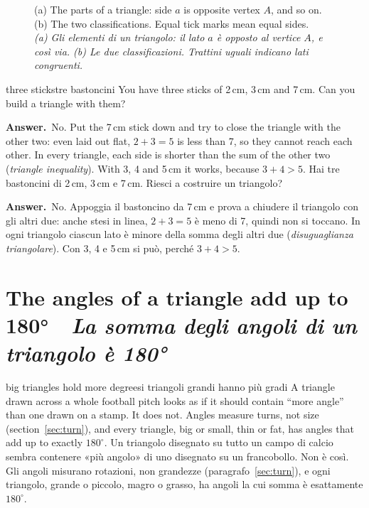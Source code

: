 \documentclass[10pt,a4paper,oneside]{book}
\newif\ifIT
\newcommand{\bisection}[2]{%
  \Needspace{7\baselineskip}%
  \section[#1 \textperiodcentered\ #2]{#1 {\color{itgreen}\itshape\,\textperiodcentered\ #2}}}
\newcommand{\bicap}[2]{\caption{#1\\{\color{itgreen}\itshape #2}}}
\newcommand{\answer}{\par\vspace{2pt}{\color{deeporange}\rule[0.5ex]{\linewidth}{0.4pt}}\par
  {\sffamily\bfseries\small\color{deeporange}\ifIT Risposta\else Answer\fi.}\ }
\begin{document}
\begin{figure}[htbp]
\bicap{(a) The parts of a triangle: side $a$ is opposite vertex $A$, and so on. (b) The two classifications. Equal tick marks mean equal sides.}%
      {(a) Gli elementi di un triangolo: il lato $a$ è opposto al vertice $A$, e così via. (b) Le due classificazioni. Trattini uguali indicano lati congruenti.}
\label{fig:anatomy}
\end{figure}

\begin{think}{three sticks}{tre bastoncini}
You have three sticks of 2\,cm, 3\,cm and 7\,cm. Can you build a triangle with them?
\answer No. Put the 7\,cm stick down and try to close the triangle with the other two: even laid out flat, $2 + 3 = 5$ is less than 7, so they cannot reach each other. In every triangle, each side is shorter than the sum of the other two (\emph{triangle inequality}). With 3, 4 and 5\,cm it works, because $3 + 4 > 5$.
\tcblower
Hai tre bastoncini di 2\,cm, 3\,cm e 7\,cm. Riesci a costruire un triangolo?
\answer No. Appoggia il bastoncino da 7\,cm e prova a chiudere il triangolo con gli altri due: anche stesi in linea, $2 + 3 = 5$ è meno di 7, quindi non si toccano. In ogni triangolo ciascun lato è minore della somma degli altri due (\emph{disuguaglianza triangolare}). Con 3, 4 e 5\,cm si può, perché $3 + 4 > 5$.
\end{think}

\bisection{The angles of a triangle add up to 180°}{La somma degli angoli di un triangolo è 180°}\label{sec:sum180}
\begin{trap}{big triangles hold more degrees}{i triangoli grandi hanno più gradi}
A triangle drawn across a whole football pitch looks as if it should contain ``more angle'' than one drawn on a stamp. It does not. Angles measure turns, not size (section~\ref{sec:turn}), and every triangle, big or small, thin or fat, has angles that add up to exactly $180^\circ$.
\tcblower
Un triangolo disegnato su tutto un campo di calcio sembra contenere «più angolo» di uno disegnato su un francobollo. Non è così. Gli angoli misurano rotazioni, non grandezze (paragrafo~\ref{sec:turn}), e ogni triangolo, grande o piccolo, magro o grasso, ha angoli la cui somma è esattamente $180^\circ$.
\end{trap}
\end{document}

